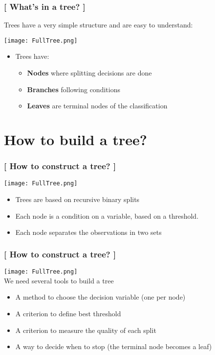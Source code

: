 \documentclass[xcolor=x11names,compress, handhouts]{beamer}
\renewcommand{\(}{\begin{columns}}
\renewcommand{\)}{\end{columns}}
\newcommand{\<}[1]{\begin{column}{#1}}
\renewcommand{\>}{\end{column}}
\begin{document}
\begin{frame} %
\frametitle{\textcolor{brique}{[ What's in a tree? ]}}
Trees have a very simple structure and are easy to understand: 
\begin{center} \texttt{[image: FullTree.png]} \end{center}
\pause
\begin{itemize}[<+->]
  \item[] Trees have:
  \begin{itemize}[<+->]
    \item \textbf{Nodes} where splitting decisions are done
    \item \textbf{Branches}  following conditions
    \item \textbf{Leaves} are terminal nodes of the classification
  \end{itemize}
\end{itemize}
\end{frame}
 \section{How to build a tree?}

\begin{frame} 
\frametitle{\textcolor{brique}{[ How to construct a tree? ]}}

\begin{center} \texttt{[image: FullTree.png]} \end{center}
\pause
\begin{itemize}[<+->]
    \item Trees are based on recursive binary splits
    \item Each node is a condition on a variable, based on a threshold. 
    \item Each node separates the observations in two sets 
\end{itemize}
\end{frame}



\begin{frame}
\frametitle{\textcolor{brique}{[ How to construct a tree? ]}}
 \hfill \texttt{[image: FullTree.png]} \\
 
We need several tools to build a tree
\pause
\begin{itemize}[<+->]
    \item  A method to choose the decision variable (one per node)
    \item  A criterion to define best threshold  
    \item  A criterion to measure the quality of each split 
    \item  A way to decide when to stop (the terminal node becomes a leaf)
\end{itemize}
\end{frame}
\end{document}
